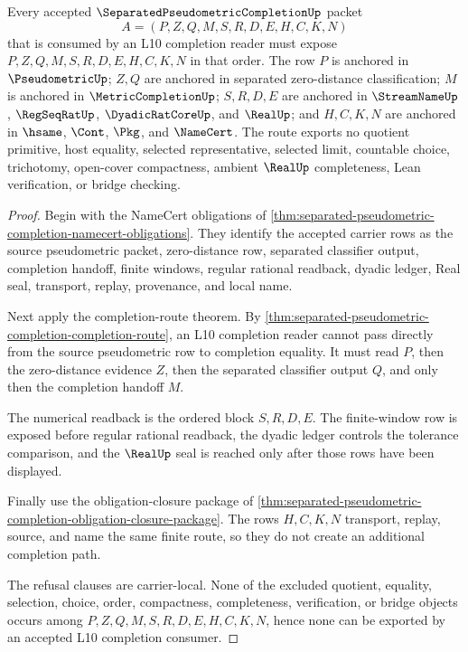 \begin{theorem}
\label{thm:separated-pseudometric-completion-scope}
Every accepted $\SeparatedPseudometricCompletionUp$ packet
$$
A=(P,Z,Q,M,S,R,D,E,H,C,K,N)
$$
that is consumed by an L10 completion reader must expose $P,Z,Q,M,S,R,D,E,H,C,K,N$ in that order. The row $P$ is anchored in $\PseudometricUp$; $Z,Q$ are anchored in separated zero-distance classification; $M$ is anchored in $\MetricCompletionUp$; $S,R,D,E$ are anchored in $\StreamNameUp$, $\RegSeqRatUp$, $\DyadicRatCoreUp$, and $\RealUp$; and $H,C,K,N$ are anchored in $\hsame$, $\Cont$, $\Pkg$, and $\NameCert$. The route exports no quotient primitive, host equality, selected representative, selected limit, countable choice, trichotomy, open-cover compactness, ambient $\RealUp$ completeness, Lean verification, or bridge checking.
\end{theorem}
\begin{proof}
Begin with the NameCert obligations of \autoref{thm:separated-pseudometric-completion-namecert-obligations}. They identify the accepted carrier rows as the source pseudometric packet, zero-distance row, separated classifier output, completion handoff, finite windows, regular rational readback, dyadic ledger, Real seal, transport, replay, provenance, and local name.

Next apply the completion-route theorem. By \autoref{thm:separated-pseudometric-completion-completion-route}, an L10 completion reader cannot pass directly from the source pseudometric row to completion equality. It must read $P$, then the zero-distance evidence $Z$, then the separated classifier output $Q$, and only then the completion handoff $M$.

The numerical readback is the ordered block $S,R,D,E$. The finite-window row is exposed before regular rational readback, the dyadic ledger controls the tolerance comparison, and the $\RealUp$ seal is reached only after those rows have been displayed.

Finally use the obligation-closure package of \autoref{thm:separated-pseudometric-completion-obligation-closure-package}. The rows $H,C,K,N$ transport, replay, source, and name the same finite route, so they do not create an additional completion path.

The refusal clauses are carrier-local. None of the excluded quotient, equality, selection, choice, order, compactness, completeness, verification, or bridge objects occurs among $P,Z,Q,M,S,R,D,E,H,C,K,N$, hence none can be exported by an accepted L10 completion consumer.
\end{proof}


